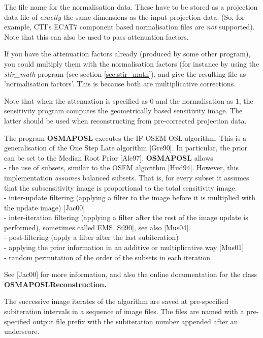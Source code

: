 \documentclass{article}
\newcommand{\tab}{\hspace{5mm}}
\begin{document}
The file name for the normalisation data. These have to be stored 
as a projection data file of \textit{exactly} the same dimensions 
as the input projection data. (So, for example, CTI's ECAT7 component 
based normalisation files are \textit{not} supported). Note that this 
can also be used to pass attenuation factors.


If you have the attenuation factors already (produced by some 
other program), you could multiply them with the normalisation 
factors (for instance by using the \textit{stir\_math} program (see 
section \ref{sec:stir_math}), and give the resulting file as 'normalisation 
factors'. This is because both are multiplicative corrections.


Note that when the attenuation is specified as 0 and the normalisation 
as 1, the sensitivity program computes the geometrically based 
sensitivity image. The latter should be used when reconstructing 
from pre-corrected projection data.

{ 
}
\label{sec:OSMAPOSL}

The program \textbf{OSMAPOSL} executes the IF-OSEM-OSL algorithm. 
This is a generalisation of the One Step Late algorithm [Gre90]. In 
particular, the prior can be set to the Median Root Prior [Ale97]. \textbf{OSMAPOSL} 
allows \\
-\tab 
the use of subsets, similar to the OSEM algorithm [Hud94]. However, 
this implementation \textit{assumes} balanced subsets. That is, for 
every subset it assumes that the subsensitivity image is proportional 
to the total sensitivity image.\\
-\tab 
inter-update filtering (applying a filter to the image before 
it is multiplied with the update image) [Jac00]\\
-\tab 
inter-iteration filtering (applying a filter after the rest of 
the image update is performed), sometimes called EMS [Sil90], 
see also [Mus04].\\
-\tab 
post-filtering (apply a filter after the last subiteration)\\
-\tab 
applying the prior information in an additive or multiplicative 
way [Mus01]\\
-\tab 
random permutation of the order of the subsets in each iteration


See [Jac00] for more information, and also the online documentation 
for the class \textbf{OSMAPOSLReconstruction.}


The successive image iterates of the algorithm are saved at pre-specified 
subiteration intervals in a sequence of image files. The files 
are named with a pre-specified output file prefix with the subiteration 
number appended after an underscore.
\end{document}
